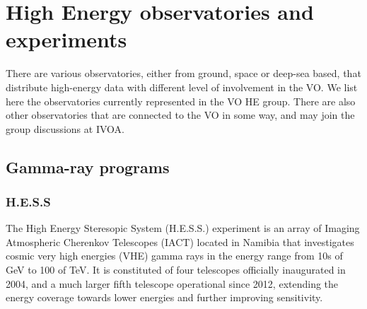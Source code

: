\documentclass[11pt,a4paper]{ivoa}
\begin{document}





\section{High Energy observatories and experiments}

There are various observatories, either from ground, space or deep-sea based, that distribute high-energy data with
different level of involvement in the VO. We list here the observatories currently represented in the VO HE group.
There are also other observatories that are connected to the VO in some way, and may join the group discussions at IVOA.


\subsection{Gamma-ray programs}

\subsubsection{H.E.S.S}
\label{sec:hess}

The High Energy Steresopic System (H.E.S.S.) experiment is an array of Imaging Atmospheric Cherenkov Telescopes (IACT)
located in Namibia that investigates cosmic very high energies (VHE) gamma rays in the energy range from 10s of GeV to
100 of TeV. It is constituted of four telescopes officially inaugurated in 2004, and a much larger fifth telescope
operational since 2012, extending the energy coverage towards lower energies and further improving sensitivity.
\end{document}

